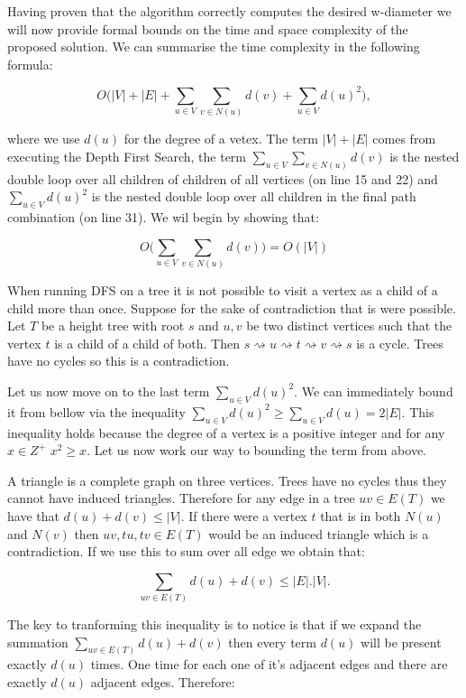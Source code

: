 
Having proven that the algorithm correctly computes the desired w-diameter we will now provide formal bounds on the time and space complexity of the proposed solution. We can summarise the time complexity in the following formula:

$$ O\bigg( |V| + |E| + \sum_{u \in V}{\sum_{v \in N(u)}{d(v)}} + \sum_{u \in V}{d(u)^2}  \bigg) ,$$

where we use $d(u)$ for the degree of a vetex. The term $|V| + |E|$ comes from executing the Depth First Search, the term $\sum_{u \in V}{\sum_{v \in N(u)}{d(v)}}$ is the nested double loop over all children of children of all vertices (on line 15 and 22) and $\sum_{u \in V}{d(u)^2}$ is the nested double loop over all children in the final path combination (on line 31). We wil begin by showing that:

$$ O\bigg( \sum_{u \in V}{\sum_{v \in N(u)}{d(v)}} \bigg) = O(|V|) $$

When running DFS on a tree it is not possible to visit a vertex as a child of a child more than once. Suppose for the sake of contradiction that is were possible. Let $T$ be a height tree with root $s$ and $u, v$ be two distinct vertices such that the vertex $t$ is a child of a child of both. Then $s \rightsquigarrow u \rightsquigarrow t \rightsquigarrow v \rightsquigarrow s$ is a cycle. Trees have no cycles so this is a contradiction.

Let us now move on to the last term $\sum_{u \in V}{d(u)^2}$. We can immediately bound it from bellow via the inequality $ \sum_{u \in V}{d(u)^2} \ge \sum_{u \in V}{d(u)} = 2|E|$. This inequality holds because the degree of a vertex is a positive integer and for any $x \in Z^+$ $ x^2 \ge x$. Let us now work our way to bounding the term from above.

A triangle is a complete graph on three vertices. Trees have no cycles thus they cannot have induced triangles. Therefore for any edge in a tree $uv \in E(T)$ we have that $d(u) + d(v) \le |V|$. If there were a vertex $t$ that is in both $N(u)$ and $N(v)$ then $uv, tu, tv \in E(T)$ would be an induced triangle which is a contradiction. If we use this to sum over all edge we obtain that:

$$ \sum_{uv \in E(T)}{d(u) + d(v)} \le |E|.|V|. $$

The key to tranforming this inequality is to notice is that if we expand the summation $\sum_{uv \in E(T)}{d(u) + d(v)}$ then every term $d(u)$ will be present exactly $d(u)$ times. One time for each one of it's adjacent edges and there are exactly $d(u)$ adjacent edges. Therefore:

